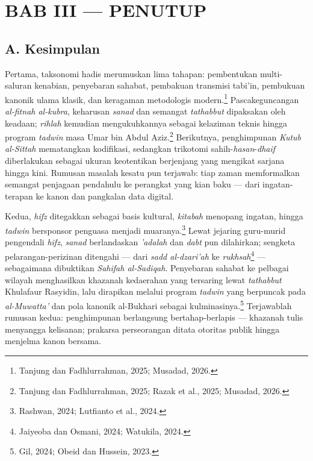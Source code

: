 
\section*{BAB III --- PENUTUP}

\subsection*{A. Kesimpulan}

Pertama, taksonomi hadis merumuskan lima tahapan: pembentukan multi-saluran kenabian, penyebaran sahabat, pembakuan transmisi tabi'in, pembukuan kanonik ulama klasik, dan keragaman metodologis modern.\footnote{Tanjung dan Fadhlurrahman, 2025; Musadad, 2026.} Pascakeguncangan \textit{al-fitnah al-kubra}, keharusan \textit{sanad} dan semangat \textit{tathabbut} dipaksakan oleh keadaan; \textit{rihlah} kemudian mengukuhkannya sebagai kelaziman teknis hingga program \textit{tadwin} masa Umar bin Abdul Aziz.\footnote{Tanjung dan Fadhlurrahman, 2025; Razak et al., 2025; Musadad, 2026.} Berikutnya, penghimpunan \textit{Kutub al-Sittah} mematangkan kodifikasi, sedangkan trikotomi sahih-\textit{hasan}-\textit{dhaif} diberlakukan sebagai ukuran keotentikan berjenjang yang mengikat sarjana hingga kini. Rumusan masalah kesatu pun terjawab: tiap zaman memformalkan semangat penjagaan pendahulu ke perangkat yang kian baku --- dari ingatan-terapan ke kanon dan pangkalan data digital.

Kedua, \textit{hifz} ditegakkan sebagai basis kultural, \textit{kitabah} menopang ingatan, hingga \textit{tadwin} bersponsor penguasa menjadi muaranya.\footnote{Rashwan, 2024; Lutfianto et al., 2024.} Lewat jejaring guru-murid pengendali \textit{hifz}, \textit{sanad} berlandaskan \textit{'adalah} dan \textit{dabt} pun dilahirkan; sengketa pelarangan-perizinan ditengahi --- dari \textit{sadd al-dzari'ah} ke \textit{rukhsah}\footnote{Jaiyeoba dan Osmani, 2024; Watukila, 2024.} --- sebagaimana dibuktikan \textit{Sahifah al-Sadiqah}. Penyebaran sahabat ke pelbagai wilayah menghasilkan khazanah kedaerahan yang tersaring lewat \textit{tathabbut} Khulafaur Rasyidin, lalu dirapikan melalui program \textit{tadwin} yang berpuncak pada \textit{al-Muwatta'} dan pola kanonik al-Bukhari sebagai kulminasinya.\footnote{Gil, 2024; Obeid dan Hussein, 2023.} Terjawablah rumusan kedua: penghimpunan berlangsung bertahap-berlapis --- khazanah tulis menyangga kelisanan; prakarsa perseorangan ditata otoritas publik hingga menjelma kanon bersama.

